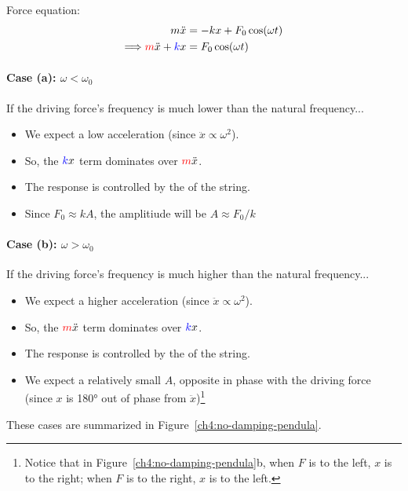 Force equation:
\begin{align}
	m\ddot{x} &= -kx + F_0 \cos(\omega t)  \notag \\
	\Longrightarrow
	\textcolor{red}{m}\ddot{x} + \textcolor{blue}{k}x &= F_0 \cos(\omega t)	\label{ch4:eq-no-b}
\end{align}

\paragraph{Case (a): $\omega < \omega_0$}
If the driving force's frequency is much lower than the natural frequency...
\begin{itemize}
	\item We expect a low acceleration (since $\ddot{x} \propto \omega^2$).
	\item So, the $\textcolor{blue}{k}x$ term dominates over $\textcolor{red}{m}\ddot{x}$.
	\item The response is controlled by the  of the string.
	\item Since $F_0 \approx kA$, the amplitiude will be $A\approx F_0/k$
\end{itemize}

\paragraph{Case (b): $\omega > \omega_0$}
If the driving force's frequency is much higher than the natural frequency...
\begin{itemize}
	\item We expect a higher acceleration (since $\ddot{x} \propto \omega^2$).
	\item So, the $\textcolor{red}{m}\ddot{x}$ term dominates over $\textcolor{blue}{k}x$.
	\item The response is controlled by the  of the string.
	\item We expect a relatively small $A$, opposite in phase with the driving force (since $x$ is 180°  out of phase from $\ddot{x}$)\footnote{Notice that in Figure~\ref{ch4:no-damping-pendula}b, when $F$ is to the left, $x$ is to the right; when $F$ is to the right, $x$ is to the left.}
\end{itemize}

These cases are summarized in Figure~\ref{ch4:no-damping-pendula}.


